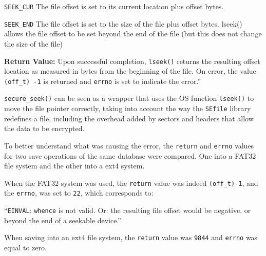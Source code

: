        \texttt{SEEK\_CUR} The file offset is set to its current location plus offset bytes.
       
       \texttt{SEEK\_END} The file offset is set to the size of the file plus offset bytes.
lseek() allows the file offset to be set beyond the end of the file
       (but this does not change the size of the file)
       
\textbf{Return Value:} Upon successful completion, \texttt{lseek()} returns the resulting offset
location as measured in bytes from the beginning of the file.  On error, the value \texttt{(off\_t) -1} is returned and \texttt{errno} is set to indicate the error.''

\vspace{7pt}
\texttt{secure\_seek()} can be seen as a wrapper that uses the OS function \texttt{lseek()} to move the file pointer correctly, taking into account the way the \texttt{SEfile} library redefines a file, including the overhead added by sectors and headers that allow the data to be encrypted.

\vspace{7pt}       
To better understand what was causing the error, the \texttt{return} and \texttt{errno} values for two save operations of the same database were compared. One into a FAT32 file system and the other into a ext4 system.

When the FAT32 system was used, the \texttt{return} value was indeed \texttt{(off\_t)-1}, and the \texttt{errno}, was set to \texttt{22}, which corresponds to:

``\texttt{EINVAL}:  \texttt{whence} is not valid.  Or: the resulting file offset would be negative, or beyond the end of a seekable device.''

When saving into an ext4 file system, the \texttt{return} value was \texttt{9844} and \texttt{errno} was equal to zero.

